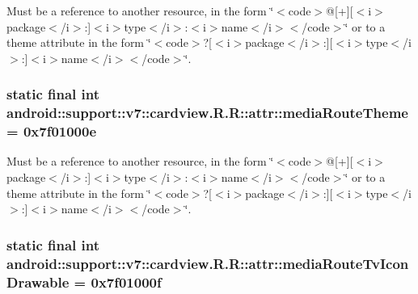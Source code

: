 Must be a reference to another resource, in the form \char`\"{}$<$code$>$@\mbox{[}+\mbox{]}\mbox{[}$<$i$>$package$<$/i$>$:\mbox{]}$<$i$>$type$<$/i$>$:$<$i$>$name$<$/i$>$$<$/code$>$\char`\"{} or to a theme attribute in the form \char`\"{}$<$code$>$?\mbox{[}$<$i$>$package$<$/i$>$:\mbox{]}\mbox{[}$<$i$>$type$<$/i$>$:\mbox{]}$<$i$>$name$<$/i$>$$<$/code$>$\char`\"{}. \hypertarget{classandroid_1_1support_1_1v7_1_1cardview_1_1_r_1_1attr_410dc70cf0c4c6bd1004f8a053e0d483}{
\subsubsection[{mediaRouteTheme}]{\setlength{\rightskip}{0pt plus 5cm}static final int android::support::v7::cardview.R.R::attr::mediaRouteTheme = 0x7f01000e}}
\label{classandroid_1_1support_1_1v7_1_1cardview_1_1_r_1_1attr_410dc70cf0c4c6bd1004f8a053e0d483}


Must be a reference to another resource, in the form \char`\"{}$<$code$>$@\mbox{[}+\mbox{]}\mbox{[}$<$i$>$package$<$/i$>$:\mbox{]}$<$i$>$type$<$/i$>$:$<$i$>$name$<$/i$>$$<$/code$>$\char`\"{} or to a theme attribute in the form \char`\"{}$<$code$>$?\mbox{[}$<$i$>$package$<$/i$>$:\mbox{]}\mbox{[}$<$i$>$type$<$/i$>$:\mbox{]}$<$i$>$name$<$/i$>$$<$/code$>$\char`\"{}. \hypertarget{classandroid_1_1support_1_1v7_1_1cardview_1_1_r_1_1attr_05b80e33113d38239a7e75bdf5034a9d}{
\subsubsection[{mediaRouteTvIconDrawable}]{\setlength{\rightskip}{0pt plus 5cm}static final int android::support::v7::cardview.R.R::attr::mediaRouteTvIconDrawable = 0x7f01000f}}
\label{classandroid_1_1support_1_1v7_1_1cardview_1_1_r_1_1attr_05b80e33113d38239a7e75bdf5034a9d}


